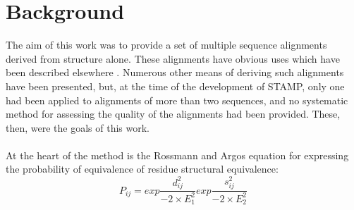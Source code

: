 \section{Background}

The aim of this work was to provide a set of multiple sequence
alignments derived from structure alone.  These alignments have 
obvious uses which have been described elsewhere \cite{rb92b,sali90}.  
Numerous other means of deriving such alignments have been 
presented, but, at the time of the development of STAMP, only one had
been applied to alignments of more than two sequences, and no 
systematic method for assessing the quality of the alignments had 
been provided.  These, then, were the goals of this work.\\
\\
At the heart of the method is the Rossmann and Argos \cite{rossmann75} 
equation for expressing the probability of equivalence of
residue structural equivalence:\\

\[
P_{ij} = exp \frac{d_{ij}^{2}}{-2 \times E_{1}^{2}} 
         exp \frac{s_{ij}^{2}}{-2 \times E_{2}^{2}} 
\]

